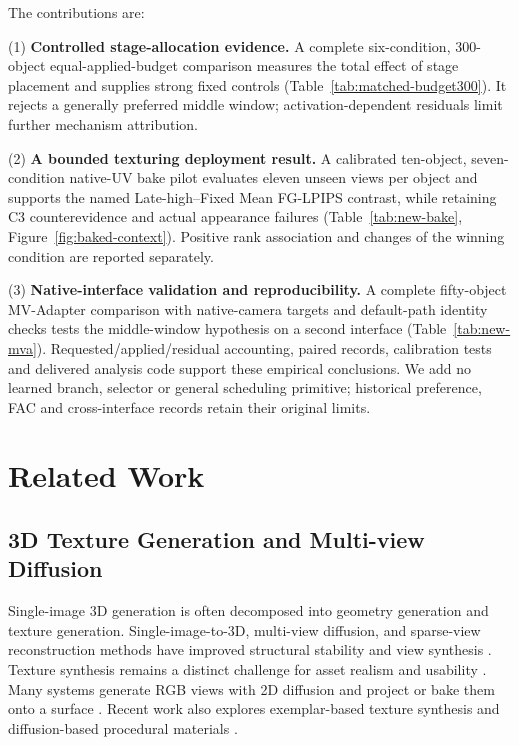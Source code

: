 \documentclass[times,twocolumn,final]{elsarticle}
\begin{document}
The contributions are:

(1) \textbf{Controlled stage-allocation evidence.} A complete six-condition, 300-object equal-applied-budget comparison measures the total effect of stage placement and supplies strong fixed controls (Table~\ref{tab:matched-budget300}). It rejects a generally preferred middle window; activation-dependent residuals limit further mechanism attribution.

(2) \textbf{A bounded texturing deployment result.} A calibrated ten-object, seven-condition native-UV bake pilot evaluates eleven unseen views per object and supports the named Late-high--Fixed Mean FG-LPIPS contrast, while retaining C3 counterevidence and actual appearance failures (Table~\ref{tab:new-bake}, Figure~\ref{fig:baked-context}). Positive rank association and changes of the winning condition are reported separately.

(3) \textbf{Native-interface validation and reproducibility.} A complete fifty-object MV-Adapter comparison with native-camera targets and default-path identity checks tests the middle-window hypothesis on a second interface (Table~\ref{tab:new-mva}). Requested/applied/residual accounting, paired records, calibration tests and delivered analysis code support these empirical conclusions. We add no learned branch, selector or general scheduling primitive; historical preference, FAC and cross-interface records retain their original limits.

\section{Related Work}
\label{sec:related}

\subsection{3D Texture Generation and Multi-view Diffusion}
\label{subsec:3dtex}

Single-image 3D generation is often decomposed into geometry generation and texture generation. Single-image-to-3D, multi-view diffusion, and sparse-view reconstruction methods have improved structural stability and view synthesis \cite{liu2023zero1to3,shi2023zero123pp,liu2023syncdreamer,long2023wonder3d,shi2024mvdream,wang2023imagedream,xu2024instantmesh,ke2024era3d}. Texture synthesis remains a distinct challenge for asset realism and usability \cite{perla2026survey}. Many systems generate RGB views with 2D diffusion and project or bake them onto a surface \cite{chen2023text2tex,richardson2023texture,poole2023dreamfusion,chen2023fantasia3d}. Recent work also explores exemplar-based texture synthesis and diffusion-based procedural materials \cite{guzman2026adaptive,lv2025interpretable}.
\end{document}
